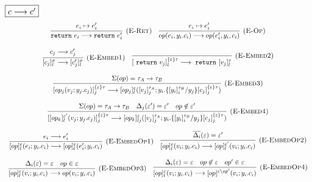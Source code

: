 \begin{figure}[p]
\footnotesize{

$\fbox{$c \longrightarrow c'$}$
\[
\begin{array}{c}
\infer[\textsc{(E-Ret)}]
  {\texttt{return}\ e_i \longrightarrow \texttt{return}\ e_i'}
  {e_i \mapsto e_i'} \quad
  
\infer[\textsc{(E-Op)}]
  {op(e_i,y_i.c_i) \longrightarrow op(e_i', y_i, c_i)}
  {e_i \mapsto e_i'} \\[3ex]
 
 \infer[\textsc{(E-Embed1)}]
{[c_j]^\sigma_l \longrightarrow [c_j']^\sigma_l}
{c_j \longrightarrow c_j'} \quad 



\infer[\textsc{(E-Embed2)}]
{[\m{return} v_j]^{\{\varepsilon\}\tau}_l \longrightarrow \m{return} [v_j]^\tau_l}
{} \\[3ex]

\infer[\textsc{(E-Embed3)}]
{[op_j(v_j; y_j.c_j)]^{\{\varepsilon\}\tau}_j \longrightarrow [op_j]^\varepsilon_l([v_j]^{\tau_A}_j; y_i. \{[y_i]^{\tau_B}_i / y_j\}[c_j]^{\{\varepsilon\}\tau}_j)}
{ \Sigma(op) = \tau_A \rightarrow \tau_B} \\[3ex]

\infer[\textsc{(E-Embed4)}]
{[[op_k]^{\varepsilon'}_{l}(v_j; y_j.c_j)]^{\{\varepsilon\}\tau}_j \longrightarrow [op_k]^\varepsilon_{lj}([v_j]^{\tau_A}_j; y_i. \{[y_i]^{\tau_B}_i / y_j\}[c_j]^{\{\varepsilon\}\tau}_j)}
{ \Sigma(op) = \tau_A \rightarrow \tau_B& \Delta_j(\varepsilon') = \varepsilon' & op \not \in \varepsilon'} \\[3ex]




 
\infer[\textsc{(E-EmbedOp1)}]
{[op]^\varepsilon_l(e_i; y_i.c_i) \longrightarrow [op]^{\varepsilon}_l(e_i'; y_i.c_i) }
{e_i \longrightarrow e_i'} \quad
 
\infer[\textsc{(E-EmbedOp2)}]
{[op]^\varepsilon_l(v_i; y_i.c_i) \longrightarrow [op]^{\varepsilon'}_l(v_i; y_i.c_i) }
{\overline{\Delta_i}(\varepsilon) = \varepsilon'} \\[3ex]

\infer[\textsc{(E-EmbedOp3)}]
{[op]^\varepsilon_l(v_i; y_i.c_i) \longrightarrow op(v_i; y_i.c_i) }
{\Delta_i(\varepsilon) = \varepsilon & op \in \varepsilon} \quad

\infer[\textsc{(E-EmbedOp4)}]
{[op]^\varepsilon_l(v_i; y_i.c_i) \longrightarrow [op]^{\varepsilon \setminus op'}(v_i; y_i.c_i) }
{\Delta_i(\varepsilon) = \varepsilon & op \not\in \varepsilon & op' \in \varepsilon} \\[3ex]



\end{array}\]}
\end{figure}
